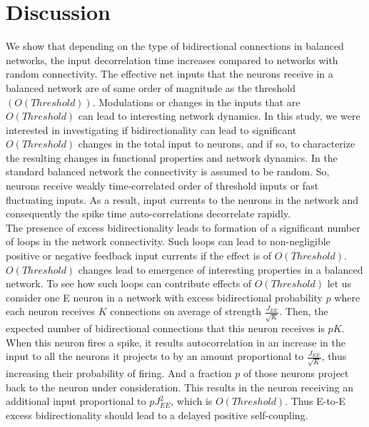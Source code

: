 \section{Discussion}
We show that depending on the type of bidirectional connections in balanced networks, the input decorrelation time increases compared to networks with random connectivity. The effective net inputs that the neurons receive in a balanced network are of same order of magnitude as the threshold $\left( O(Threshold) \right)$. Modulations or changes in the inputs that are $O(Threshold)$ can lead to interesting network dynamics. In this study, we were interested in investigating if bidirectionality can lead to significant $O(Threshold)$ changes in the total input to neurons, and if so, to characterize the resulting changes in functional properties and network dynamics. In the standard balanced network the connectivity is assumed to be random. So, neurons receive weakly time-correlated order of threshold inputs or fast fluctuating inputs. As a result, input currents to the neurons in the network and consequently the spike time auto-correlations decorrelate rapidly\cite{carl1996, carl1998}. \\
The presence of excess bidirectionality leads to formation of a significant number of loops in the network connectivity. Such loops can lead to non-negligible positive or negative feedback input currents if the effect is of $O(Threshold)$. $O(Threshold)$ changes lead to emergence of interesting properties in a balanced network. To see how such loops can contribute effects of $O(Threshold)$ let us consider one E neuron in a network with excess bidirectional probability $p$ where each neuron receives $K$ connections on average of strength $\frac{J_{EE}}{\sqrt{K}}$. Then, the expected number of bidirectional connections that this neuron receives is $pK$. When this neuron fires a spike, it results autocorrelation in an increase in the input to all the neurons it projects to by an amount proportional to $\frac{J_{EE}}{\sqrt{K}}$, thus increasing their probability of firing. And a fraction $p$ of those neurons project back to the neuron under consideration. This results in the neuron receiving an additional input proportional to $p J_{EE}^{2}$, which is $O(Threshold)$. Thus E-to-E excess bidirectionality should lead to a delayed positive self-coupling. 
